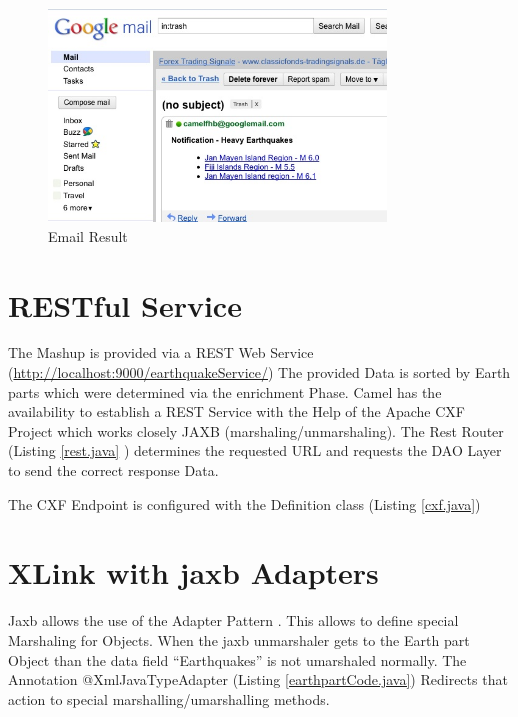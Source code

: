 \documentclass[11pt,english,ngerman, headsepline]{scrreprt}
\begin{document}
 \begin{figure}[h!]
	\begin{center}
	\includegraphics[width=0.8\textwidth]{pics/EmailResult.jpg}
	\end{center}
	\caption{Email Result}
	\label{EmailResult} 
   \end{figure}

 




\chapter{RESTful Service}

The Mashup is provided via a REST Web Service
(\url{http://localhost:9000/earthquakeService/})
The provided Data is sorted by Earth parts which were determined via the
enrichment Phase.
Camel has the availability to establish a REST Service with the Help of the
Apache CXF Project which works closely JAXB (marshaling/unmarshaling). 
The Rest Router (Listing \ref{rest.java} ) determines the requested URL and
requests the DAO Layer \cite{fowler2002patterns} to send the correct response
Data.



The CXF Endpoint is configured with the Definition class (Listing
\ref{cxf.java})
   


\chapter{XLink with jaxb Adapters}
Jaxb allows the use of the Adapter Pattern \cite{gamma1995design}. This allows
to define special Marshaling for Objects.
When the jaxb unmarshaler gets to the Earth part Object than the data field
``Earthquakes'' is not umarshaled normally. 
The Annotation @XmlJavaTypeAdapter (Listing \ref{earthpartCode.java}) Redirects that
action to special marshalling/umarshalling methods. 
\end{document}
